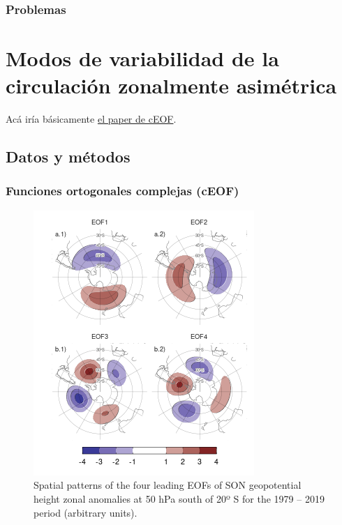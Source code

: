 \documentclass[12pt,oneside]{reedthesis}
\begin{document}
\hypertarget{problemas}{%
\subsubsection{Problemas}\label{problemas}}

\hypertarget{modos-de-variabilidad-de-la-circulaciuxf3n-zonalmente-asimuxe9trica}{%
\section{Modos de variabilidad de la circulación zonalmente asimétrica}\label{modos-de-variabilidad-de-la-circulaciuxf3n-zonalmente-asimuxe9trica}}

Acá iría básicamente \href{https://github.com/eliocamp/shceof}{el paper de cEOF}.

\hypertarget{datos-y-muxe9todos}{%
\subsection{Datos y métodos}\label{datos-y-muxe9todos}}

\hypertarget{funciones-ortogonales-complejas-ceof}{%
\subsubsection{Funciones ortogonales complejas (cEOF)}\label{funciones-ortogonales-complejas-ceof}}



\begin{figure}
\includegraphics{figures/20-ceofs/eof-naive-1} \caption{Spatial patterns of the four leading EOFs of SON geopotential height zonal anomalies at 50 hPa south of 20º S for the 1979 -- 2019 period (arbitrary units).}\label{fig:eof-naive}
\end{figure}
\end{document}
